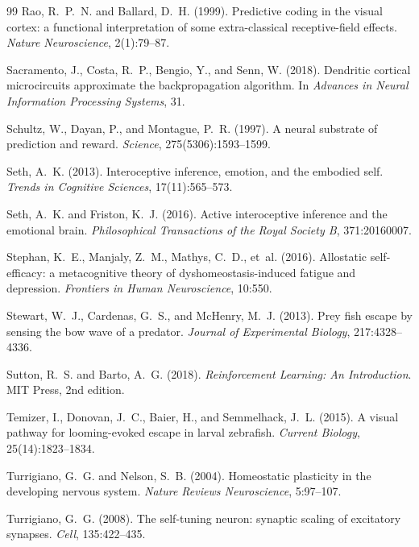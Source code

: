 \documentclass[12pt]{article}
\begin{document}
\begin{thebibliography}{99}
Rao, R.~P.~N. and Ballard, D.~H. (1999).
Predictive coding in the visual cortex: a functional interpretation of some extra-classical receptive-field effects.
\textit{Nature Neuroscience}, 2(1):79--87.

Sacramento, J., Costa, R.~P., Bengio, Y., and Senn, W. (2018).
Dendritic cortical microcircuits approximate the backpropagation algorithm.
In \textit{Advances in Neural Information Processing Systems}, 31.

Schultz, W., Dayan, P., and Montague, P.~R. (1997).
A neural substrate of prediction and reward.
\textit{Science}, 275(5306):1593--1599.

Seth, A.~K. (2013).
Interoceptive inference, emotion, and the embodied self.
\textit{Trends in Cognitive Sciences}, 17(11):565--573.

Seth, A.~K. and Friston, K.~J. (2016).
Active interoceptive inference and the emotional brain.
\textit{Philosophical Transactions of the Royal Society B}, 371:20160007.

Stephan, K.~E., Manjaly, Z.~M., Mathys, C.~D., et~al. (2016).
Allostatic self-efficacy: a metacognitive theory of dyshomeostasis-induced fatigue and depression.
\textit{Frontiers in Human Neuroscience}, 10:550.

Stewart, W.~J., Cardenas, G.~S., and McHenry, M.~J. (2013).
Prey fish escape by sensing the bow wave of a predator.
\textit{Journal of Experimental Biology}, 217:4328--4336.

Sutton, R.~S. and Barto, A.~G. (2018).
\textit{Reinforcement Learning: An Introduction}.
MIT Press, 2nd edition.

Temizer, I., Donovan, J.~C., Baier, H., and Semmelhack, J.~L. (2015).
A visual pathway for looming-evoked escape in larval zebrafish.
\textit{Current Biology}, 25(14):1823--1834.

Turrigiano, G.~G. and Nelson, S.~B. (2004).
Homeostatic plasticity in the developing nervous system.
\textit{Nature Reviews Neuroscience}, 5:97--107.

Turrigiano, G.~G. (2008).
The self-tuning neuron: synaptic scaling of excitatory synapses.
\textit{Cell}, 135:422--435.


\end{thebibliography}
\end{document}
